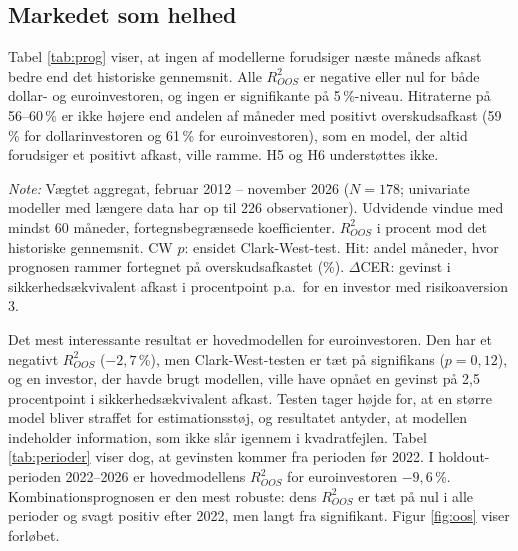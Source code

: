 \documentclass[11pt,a4paper]{article}
\begin{document}
\subsection{Markedet som helhed}
Tabel \ref{tab:prog} viser, at ingen af modellerne forudsiger næste måneds afkast bedre end det historiske gennemsnit. Alle $R^2_{OOS}$ er negative eller nul for både dollar- og euroinvestoren, og ingen er signifikante på 5\,\%-niveau. Hitraterne på 56--60\,\% er ikke højere end andelen af måneder med positivt overskudsafkast (59\,\% for dollarinvestoren og 61\,\% for euroinvestoren), som en model, der altid forudsiger et positivt afkast, ville ramme. H5 og H6 understøttes ikke.

\begin{table}[htbp]
\centering
\begin{threeparttable}
\caption{Forudsigelse af næste måneds overskudsafkast uden for stikprøven}
\label{tab:prog}
\footnotesize
\setlength{\tabcolsep}{4pt}

\begin{tablenotes}\footnotesize
\item \emph{Note:} Vægtet aggregat, februar 2012 -- november 2026 ($N=178$; univariate modeller med længere data har op til 226 observationer). Udvidende vindue med mindst 60 måneder, fortegnsbegrænsede koefficienter. $R^2_{OOS}$ i procent mod det historiske gennemsnit. CW $p$: ensidet Clark-West-test. Hit: andel måneder, hvor prognosen rammer fortegnet på overskudsafkastet (\%). $\Delta$CER: gevinst i sikkerhedsækvivalent afkast i procentpoint p.a.\ for en investor med risikoaversion 3.
\end{tablenotes}
\end{threeparttable}
\end{table}

Det mest interessante resultat er hovedmodellen for euroinvestoren. Den har et negativt $R^2_{OOS}$ ($-2{,}7$\,\%), men Clark-West-testen er tæt på signifikans ($p=0{,}12$), og en investor, der havde brugt modellen, ville have opnået en gevinst på 2,5 procentpoint i sikkerhedsækvivalent afkast. Testen tager højde for, at en større model bliver straffet for estimationsstøj, og resultatet antyder, at modellen indeholder information, som ikke slår igennem i kvadratfejlen. Tabel \ref{tab:perioder} viser dog, at gevinsten kommer fra perioden før 2022. I holdout-perioden 2022--2026 er hovedmodellens $R^2_{OOS}$ for euroinvestoren $-9{,}6$\,\%. Kombinationsprognosen er den mest robuste: dens $R^2_{OOS}$ er tæt på nul i alle perioder og svagt positiv efter 2022, men langt fra signifikant. Figur \ref{fig:oos} viser forløbet.
\end{document}
